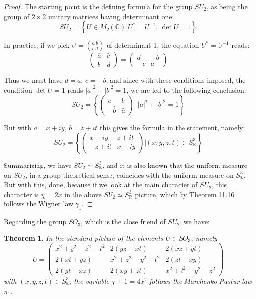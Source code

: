 \documentclass[12pt]{amsbook}
\newtheorem{theorem}{Theorem}[chapter]
\begin{document}
\begin{proof}
The starting point is the defining formula for the group $SU_2$, as being the group of $2\times2$ unitary matrices having determinant one:
$$SU_2=\left\{U\in M_2(\mathbb C)\Big|U^*=U^{-1},\,\det U=1\right\}$$

In practice, if we pick $U=\binom{a\ b}{c\ d}$ of determinant 1, the equation $U^*=U^{-1}$ reads:
$$\begin{pmatrix}\bar{a}&\bar{c}\\ \bar{b}&\bar{d}\end{pmatrix}
=\begin{pmatrix}d&-b\\ -c&a\end{pmatrix}$$

Thus we must have $d=\bar{a}$, $c=-\bar{b}$, and since with these conditions imposed, the condition $\det U=1$ reads $|a|^2+|b|^2=1$, we are led to the following conclusion:
$$SU_2=\left\{\begin{pmatrix}a&b\\ -\bar{b}&\bar{a}\end{pmatrix}\Big|\ |a|^2+|b|^2=1\right\}$$

But with $a=x+iy$, $b=z+it$ this gives the formula in the statement, namely:
$$SU_2=\left\{\begin{pmatrix}x+iy&z+it\\ -z+it&x-iy\end{pmatrix}\Big|(x,y,z,t)\in S^3_\mathbb R\right\}$$

Summarizing, we have $SU_2\simeq S^3_\mathbb R$, and it is also known that the uniform measure on $SU_2$, in a group-theoretical sense, coincides with the uniform measure on $S^3_\mathbb R$. But with this, done, because if we look at the main character of $SU_2$, this character is $\chi=2x$ in the above $SU_2\simeq S^3_\mathbb R$ picture, which by Theorem 11.16 follows the Wigner law $\gamma_1$.
\end{proof}

Regarding the group $SO_3$, which is the close friend of $SU_2$, we have:


\begin{theorem}
In the standard picture of the elements $U\in SO_3$, namely
$$U=\begin{pmatrix}
x^2+y^2-z^2-t^2&2(yz-xt)&2(xz+yt)\\
2(xt+yz)&x^2+z^2-y^2-t^2&2(zt-xy)\\
2(yt-xz)&2(xy+zt)&x^2+t^2-y^2-z^2
\end{pmatrix}$$
with $(x,y,z,t)\in S^3_\mathbb R$, the variable $\chi+1=4x^2$ follows the Marchenko-Pastur law $\pi_1$.
\end{theorem}
\end{document}
